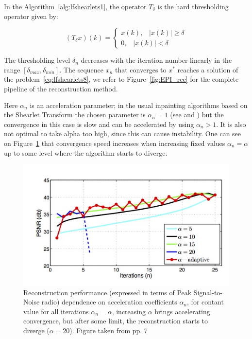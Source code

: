 \bigskip

In the Algorithm~\ref{alg:lfshearlets1}, the operator $T_{\delta}$ is the hard thresholding operator given by:

$$
(T_{\delta}x)(k)=\begin{cases} x(k)\textrm{,}\quad |x(k)|\geq \delta \\ 0\textrm{,}\quad |x(k)|<\delta \end{cases}
$$

The thresholding level $\delta_n$ decreases with the iteration number linearly in the range $[\delta_{max},\delta_{min}]$. The sequence $x_n$ that converges to $x^*$ reaches a solution of the problem~\ref{eq:lfshearlets8}, we refer to Figure~\ref{fig:EPI_rec} for the complete pipeline of the reconstruction method.

\bigskip

Here $\alpha_n$ is an acceleration parameter; in the usual inpainting algorithms based on the Shearlet Transform the chosen parameter is $\alpha_n=1$ (see \cite{Analysisinpaint} and \cite{Shearlab}) but the convergence in this case is slow and can be accelerated by using $\alpha_n>1$. It is also not optimal to take alpha too high, since this can cause instability. One can see on Figure~\ref{fig:alpha_accel} that convergence speed increases when increasing fixed values $\alpha_n = \alpha$ up to some level where the algorithm starts to diverge.

\begin{figure}[h!]
\centering
\includegraphics[width = 0.9 \textwidth]{./Diagrams/alpha_accel.jpg}
\caption{Reconstruction performance (expressed in terms of Peak Signal-to-Noise radio) dependence on acceleration coefficients $\alpha_n$, for contant value for all iterations $\alpha_n=\alpha$, increasing $\alpha$ brings accelerating convergence, but after some limit, the reconstruction starts to diverge ($\alpha = 20$). Figure taken from \cite{LF-Shearlets} pp. 7}
\label{fig:alpha_accel}
\end{figure}

